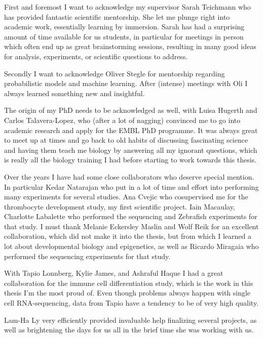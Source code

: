 
\begin{acknowledgements}      

First and foremost I want to acknowledge my supervisor Sarah Teichmann who has provided fantastic scientific mentorship. She let me plunge right into academic work, essentially learning by immersion. Sarah has had a surprising amount of time available for us students, in particular for meetings in person which often end up as great brainstorming sessions, resulting in many good ideas for analysis, experiments, or scientific questions to address.

Secondly I want to acknowledge Oliver Stegle for mentorship regarding probabilistic models and machine learning. After (intense) meetings with Oli I always learned something new and insightful.

The origin of my PhD needs to be acknowledged as well, with Luisa Hugerth and Carlos Talavera-Lopez, who (after a lot of nagging) convinced me to go into academic research and apply for the EMBL PhD programme. It was always great to meet up at times and go back to old habits of discussing fascinating science and having them teach me biology by answering all my ignorant questions, which is really all the biology training I had before starting to work towards this thesis.

Over the years I have had some close collaborators who deserve special mention. In particular Kedar Natarajan who put in a lot of time and effort into performing many experiments for several studies. Ana Cvejic who cosupervised me for the thrombocyte development study, my first scientific project. Iain Macaulay, Charlotte Labalette who performed the sequencing and Zebrafish experiments for that study. I must thank Melanie Eckersley Maslin and Wolf Reik for an excellent collaboration, which did not make it into the thesis, but from which I learned a lot about developmental biology and epigenetics, as well as Ricardo Miragaia who performed the sequencing experiments for that study.

With Tapio Lonnberg, Kylie James, and Ashraful Haque I had a great collaboration for the immune cell differentiation study, which is the work in this thesis I'm the most proud of. Even though problems always happen with single cell RNA-sequencing, data from Tapio have a tendency to be of very high quality.

Lam-Ha Ly very efficiently provided invaluable help finalizing several projects, as well as brightening the days for us all in the brief time she was working with us.


\end{acknowledgements}
